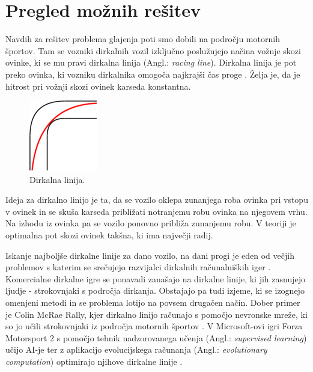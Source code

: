 \documentclass[10pt,a4paper]{article}
\begin{document}
\section{Pregled možnih rešitev}

Navdih za rešitev problema glajenja poti smo dobili na področju motornih športov. Tam se vozniki dirkalnih vozil izključno poslužujejo načina vožnje skozi ovinke, ki se mu pravi dirkalna linija (Angl.: \textit{racing line}). Dirkalna linija je pot preko ovinka, ki vozniku dirkalnika omogoča najkrajši čas proge \cite{vir2}. Želja je, da je hitrost pri vožnji skozi ovinek karseda konstantna.

\begin{figure}[H]
	\centering
	\includegraphics[width=3cm]{pic/slika4.png}
	\caption{Dirkalna linija.}
	\label{fig:slika}
\end{figure}

Ideja za dirkalno linijo je ta, da se vozilo oklepa zunanjega roba ovinka pri vstopu v ovinek in se skuša karseda približati notranjemu robu ovinka na njegovem vrhu. Na izhodu iz ovinka pa se vozilo ponovno približa zunanjemu robu. V teoriji je optimalna pot skozi ovinek takšna, ki ima največji radij.

Iskanje najboljše dirkalne linije za dano vozilo, na dani progi je eden od večjih problemov s katerim se srečujejo razvijalci dirkalnih računalniških iger \cite{vir3}. Komercialne dirkalne igre se ponavadi zanašajo na dirkalne linije, ki jih zasnujejo ljudje - strokovnjaki s področja dirkanja. Obstajajo pa tudi izjeme, ki se izognejo omenjeni metodi in se problema lotijo na povsem drugačen način. Dober primer je Colin McRae Rally, kjer dirkalno linijo računajo s pomočjo nevronske mreže, ki so jo učili strokovnjaki iz področja motornih športov \cite{vir3}. V Microsoft-ovi igri Forza Motorsport 2 s pomočjo tehnik nadzorovanega učenja (Angl.: \textit{supervised learning}) učijo AI-je ter z aplikacijo evolucijskega računanja (Angl.: \textit{evolutionary computation}) optimirajo njihove dirkalne linije \cite{vir4}.
\end{document}
